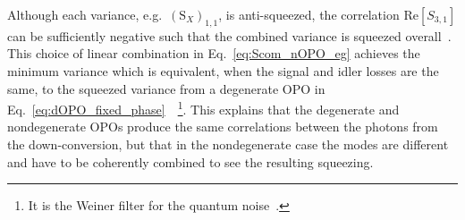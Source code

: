Although each variance, e.g.\ $(\text{S}_X)_{1,1}$, is anti-squeezed, the correlation $\text{Re}[S_{3,1}]$ can be sufficiently negative such that the combined variance is squeezed overall~\cite{}. This choice of linear combination in Eq.~\ref{eq:Scom_nOPO_eg} achieves the minimum variance which is equivalent, when the signal and idler losses are the same, to the squeezed variance from a degenerate OPO in Eq.~\ref{eq:dOPO_fixed_phase}~\cite{}~\footnote{It is the Weiner filter for the quantum noise~\cite{}.}.
This explains that the degenerate and nondegenerate OPOs produce the same correlations between the photons from the down-conversion, but that in the nondegenerate case the modes are different and have to be coherently combined to see the resulting squeezing. %

